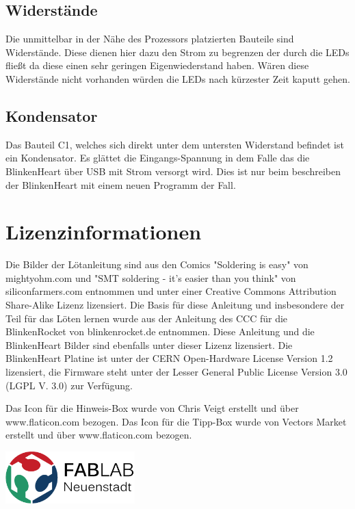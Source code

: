 \documentclass{article} %
\begin{document}
\subsection{Widerstände}
Die unmittelbar in der Nähe des Prozessors platzierten Bauteile sind Widerstände. Diese dienen hier dazu den Strom zu begrenzen der durch die LEDs fließt da diese einen sehr geringen Eigenwiederstand haben. Wären diese Widerstände nicht vorhanden würden die LEDs nach kürzester Zeit kaputt gehen.

\newpage
\subsection{Kondensator}
Das Bauteil C1, welches sich direkt unter dem untersten Widerstand befindet ist ein Kondensator. Es glättet die Eingangs-Spannung in dem Falle das die BlinkenHeart über USB mit Strom versorgt wird. Dies ist nur beim beschreiben der BlinkenHeart mit einem neuen Programm der Fall.

\newpage
\section{Lizenzinformationen}
{\footnotesize Die Bilder der Lötanleitung sind aus den Comics "Soldering is easy" von mightyohm.com und
"SMT soldering - it's easier than you think" von siliconfarmers.com entnommen und unter einer
Creative Commons Attribution Share-Alike Lizenz lizensiert.
Die Basis für diese Anleitung
und insbesondere der Teil für das Löten lernen wurde aus der Anleitung des CCC für die BlinkenRocket
von blinkenrocket.de entnommen.
Diese Anleitung und die BlinkenHeart Bilder sind ebenfalls unter dieser Lizenz lizensiert.
Die BlinkenHeart Platine ist unter der CERN Open-Hardware License Version 1.2 lizensiert, die Firmware steht unter der Lesser General
Public License Version 3.0 (LGPL V. 3.0) zur Verfügung.

Das Icon für die Hinweis-Box wurde von Chris Veigt erstellt und über www.flaticon.com bezogen.
Das Icon für die Tipp-Box wurde von Vectors Market erstellt und über www.flaticon.com bezogen.}

\begin{center}
	\includegraphics[width=5cm]{logo}
\end{center}
\end{document}
